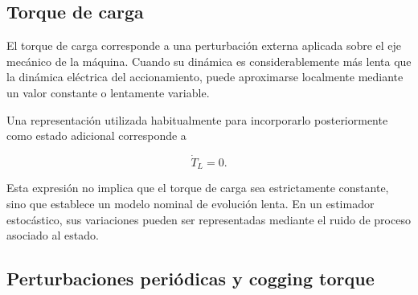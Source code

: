 
\subsection{Torque de carga}

%
%
%

El torque de carga corresponde a una perturbación externa aplicada sobre el 
eje mecánico de la máquina. Cuando su dinámica es considerablemente más lenta 
que la dinámica eléctrica del accionamiento, puede aproximarse localmente 
mediante un valor constante o lentamente variable.

Una representación utilizada habitualmente para incorporarlo posteriormente 
como estado adicional corresponde a

\begin{equation}
\label{eq:torque_carga_estado}
\dot{T}_L = 0.
\end{equation}

Esta expresión no implica que el torque de carga sea estrictamente constante, 
sino que establece un modelo nominal de evolución lenta. En un estimador 
estocástico, sus variaciones pueden ser representadas mediante el ruido de 
proceso asociado al estado.



\subsection{Perturbaciones periódicas y cogging torque}

%
%
%
%

